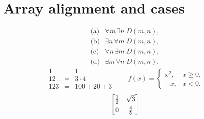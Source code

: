 \documentclass[11pt]{article}
\begin{document}
\pagestyle{empty}
\section*{Array alignment and cases}
\[
\begin{array}{ll}
\text{(a)} & \forall m\,\exists n\;D(m,n),\\[2pt]
\text{(b)} & \exists n\,\forall m\;D(m,n),\\[2pt]
\text{(c)} & \forall n\,\exists m\;D(m,n),\\[2pt]
\text{(d)} & \exists m\,\forall n\;D(m,n).
\end{array}
\]
\[
\begin{array}{r|cl}
1 & = & 1\\
12 & = & 3\cdot4\\[5pt]
123 & = & 100+20+3
\end{array}
\qquad
f(x)=\begin{cases}
x^2, & x\geq0,\\[3pt]
-x, & x<0.
\end{cases}
\]
\[
\left[\begin{array}{@{}cc@{}}
\frac{1}{2} & \sqrt{3}\\[4pt]
0 & \frac{4}{5}
\end{array}\right]
\]
\end{document}
